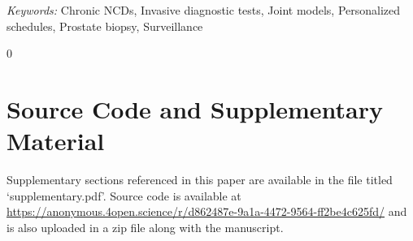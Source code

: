 \documentclass[12pt]{article}
\newcommand{\blind}{0}
\begin{document}


\noindent%
{\it Keywords:} Chronic NCDs, Invasive diagnostic tests, Joint models, Personalized schedules, Prostate biopsy, Surveillance
\vfill

\newpage
{} %







\blind
{

} \fi

\section*{Source Code and Supplementary Material}
Supplementary sections referenced in this paper are available in the file titled `supplementary.pdf'. Source code is available at \url{https://anonymous.4open.science/r/d862487e-9a1a-4472-9564-ff2be4c625fd/} and is also uploaded in a zip file along with the manuscript.

%



\end{document}
